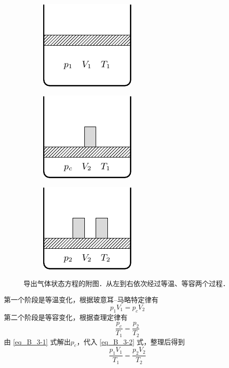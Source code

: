 \begin{figure}[htbp]
    \centering
    \begin{subfigure}{0.3\linewidth}
        \centering
        \includegraphics{fig/B/3-12a.pdf}
        \caption{}\label{fig_B_3-12a}
    \end{subfigure}
    \hfil
    \begin{subfigure}{0.3\linewidth}
        \centering
        \includegraphics{fig/B/3-12b.pdf}
        \caption{}\label{fig_B_3-12b}
    \end{subfigure}
    \hfil
    \begin{subfigure}{0.3\linewidth}
        \centering
        \includegraphics{fig/B/3-12c.pdf}
        \caption{}\label{fig_B_3-12c}
    \end{subfigure}
    \caption{导出气体状态方程的附图．从左到右依次经过等温、等容两个过程．}\label{fig_B_3-12}
\end{figure}

第一个阶段是等温变化，根据玻意耳--马略特定律有
\begin{equation}\label{eq_B_3-1}
p_1V_1=p_cV_2
\end{equation}
第二个阶段是等容变化，根据查理定律有
\begin{equation}\label{eq_B_3-2}
\frac{p_c}{T_1}=\frac{p_2}{T_2}
\end{equation}
由 \eqref{eq_B_3-1} 式解出$p_c$，代入 \eqref{eq_B_3-2} 式，整理后得到
\begin{equation}\label{eq_B_3-3}
\frac{p_1V_1}{T_1}=\frac{p_2V_2}{T_2}
\end{equation}

